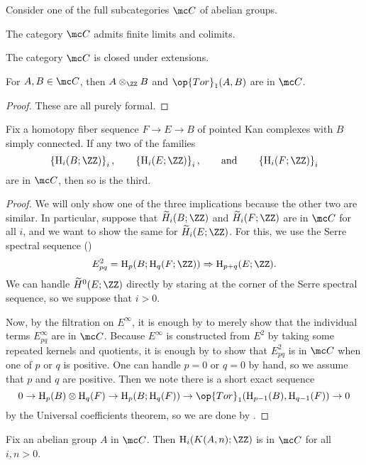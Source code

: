 \documentclass[../notes.tex]{subfiles}
\begin{document}
\begin{lemma} \label{lem:c-is-ideal}
	Consider one of the full subcategories $\mc C$ of abelian groups.
	\begin{listalph}
		\item The category $\mc C$ admits finite limits and colimits.
		\item The category $\mc C$ is closed under extensions.
		\item For $A,B\in\mc C$, then $A\otimes_\ZZ B$ and $\op{Tor}_1(A,B)$ are in $\mc C$.
	\end{listalph}
\end{lemma}
\begin{proof}
	These are all purely formal.
\end{proof}
\begin{lemma} \label{lem:homotopy-fiber-to-c}
	Fix a homotopy fiber sequence $F\to E\to B$ of pointed Kan complexes with $B$ simply connected. If any two of the families
	\[\left\{\mathrm H_i(B;\ZZ)\right\}_i,\qquad\left\{\mathrm H_i(E;\ZZ)\right\}_i,\qquad\text{and}\qquad\left\{\mathrm H_i(F;\ZZ)\right\}_i\]
	are in $\mc C$, then so is the third.
\end{lemma}
\begin{proof}
	We will only show one of the three implications because the other two are similar. In particular, suppose that $\widetilde H_i(B;\ZZ)$ and $\widetilde H_i(F;\ZZ)$ are in $\mc C$ for all $i$, and we want to show the same for $\widetilde H_i(E;\ZZ)$. For this, we use the Serre spectral sequence ()
	\[E^2_{pq}=\mathrm H_p(B;\mathrm H_q(F;\ZZ))\Rightarrow\mathrm H_{p+q}(E;\ZZ).\]
	We can handle $\widetilde H^0(E;\ZZ)$ directly by staring at the corner of the Serre spectral sequence, so we suppose that $i>0$.

	Now, by the filtration on $E^\infty$, it is enough by  to merely show that the individual terms $E^\infty_{pq}$ are in $\mc C$. Because $E^\infty$ is constructed from $E^2$ by taking some repeated kernels and quotients, it is enough by  to show that $E^2_{pq}$ is in $\mc C$ when one of $p$ or $q$ is positive. One can handle $p=0$ or $q=0$ by hand, so we assume that $p$ and $q$ are positive. Then we note there is a short exact sequence
	\[0\to\mathrm H_p(B)\otimes\mathrm H_q(F)\to\mathrm H_p(B;\mathrm H_q(F))\to\op{Tor}_1(\mathrm H_{p-1}(B),\mathrm H_{q-1}(F))\to0\]
	by the Universal coefficients theorem, so we are done by .
\end{proof}
\begin{lemma} \label{lem:k-a-n-in-c}
	Fix an abelian group $A$ in $\mc C$. Then $\mathrm H_i(K(A,n);\ZZ)$ is in $\mc C$ for all $i,n>0$.
\end{lemma}
\end{document}
